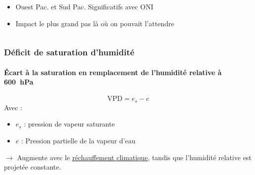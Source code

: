\documentclass[aspectratio=169, usepdftitle=false, xcolor={dvipsnames}, 9pt,table]{beamer}
\begin{document}
\begin{frame}[t]
\begin{columns}
\begin{column}{0.2\textwidth}
\begin{block}
                \begin{itemize}
                    \item Ouest Pac. et Sud Pac. Significatifs avec ONI 
                    \item Impact le plus grand pas là où on pouvait l'attendre
                \end{itemize}
            \end{block}
        \end{column}
    \end{columns}
\end{frame}

\begin{frame}
    \frametitle{Déficit de saturation d'humidité}
    \framesubtitle{Écart à la saturation en remplacement de l'humidité relative à 600~hPa}
    \small
    \begin{definition}
        \footnotesize
        \[ \text{VPD} = e_s - e \]
        Avec :
        \setlength{\leftmargini}{2.5ex}
        \begin{itemize}
            \item $e_s$ : pression de vapeur saturante
            \item $e$ : Pression partielle de la vapeur d'eau
        \end{itemize}
        $\longrightarrow$ \alert{Augmente} avec le \underline{réchauffement climatique}, tandis que l'humidité relative est projetée constante.
    \end{definition}
\end{frame}
\end{document}
